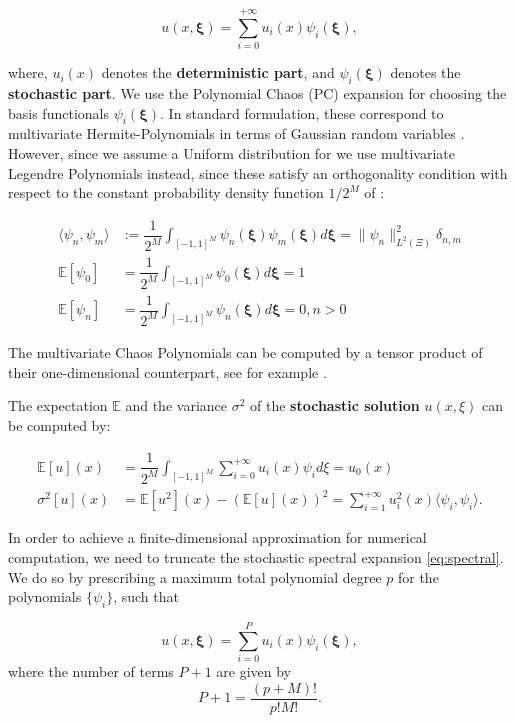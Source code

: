 \documentclass{article}
\begin{document}
\begin{equation}
\label{eq:spectral}
u(x, \bm{\xi}) = \sum_{i=0}^{+\infty} u_{i}(x) \psi_{i}(\bm{\xi}),
\end{equation}

where, $u_{i}(x)$ denotes the \textbf{deterministic part}, and $\psi_{i}(\bm{\xi})$ denotes the \textbf{stochastic part}. We use the Polynomial Chaos (PC) expansion for choosing the basis functionals $\psi_{i}(\bm{\xi})$. In standard formulation, these correspond to multivariate Hermite-Polynomials in terms of Gaussian random variables \cite{wiener1938}. However, since we assume a Uniform distribution for \bm{$\xi$} we use multivariate Legendre Polynomials instead, since these satisfy an orthogonality condition with respect to the constant probability density function $1/2^M$ of \bm{$\xi$}:

\begin{align*}
\langle\psi_{n},\psi_{m}\rangle &:= \dfrac{1}{2^M}\int_{[-1,1]^M} \psi_{n}(\bm{\xi}) \psi_{m}(\bm{\xi}) d\bm{\xi} = \|\psi_n\|_{L^2(\Xi)}^2 \delta_{n,m} \\
\mathbb{E}[\psi_{0}] &= \dfrac{1}{2^M}\int_{[-1,1]^M} \psi_{0}(\bm{\xi}) d\bm{\xi} = 1 \\
\mathbb{E}[\psi_{n}] &= \dfrac{1}{2^M}\int_{[-1,1]^M} \psi_{n}(\bm{\xi}) d\bm{\xi} = 0, n > 0
\end{align*}

The multivariate Chaos Polynomials can be computed by a tensor product of their one-dimensional counterpart, see for example \cite{Xiu:2002:WPC:587159.587325}.

The expectation $\mathbb{E}$ and the variance $\sigma^2$ of the \textbf{stochastic solution} $u(x,\xi)$ can be computed by:

\begin{align}
\mathbb{E}[u](x) &= \dfrac{1}{2^M}\int_{[-1,1]^M} \sum_{i=0}^{+\infty} u_{i}(x) \psi_{i} d\xi = u_{0}(x) \\
\sigma^2[u](x) &= \mathbb{E}[u^{2}](x) - (\mathbb{E}[u](x))^{2} = \sum_{i=1}^{+\infty} u_{i}^{2}(x) \langle\psi_{i},\psi_i\rangle.
\end{align}

In order to achieve a finite-dimensional approximation for numerical computation, we need to truncate the stochastic spectral expansion \eqref{eq:spectral}. We do so by prescribing a maximum total polynomial degree $p$ for the polynomials $\{\psi_i\}$, such that

\begin{equation}
\label{eq:truncated_poly_multi}
u(x,\bm{\xi}) = \sum_{i=0}^{P} u_i(x) \psi_{i}(\bm{\xi}),
\end{equation}
where the number of terms $P+1$ are given by \cite{maitre2010spectral}
\begin{equation}
\label{eq:modes}
P+1 = \dfrac{(p+M)!}{p!M!}.
\end{equation}
\end{document}

